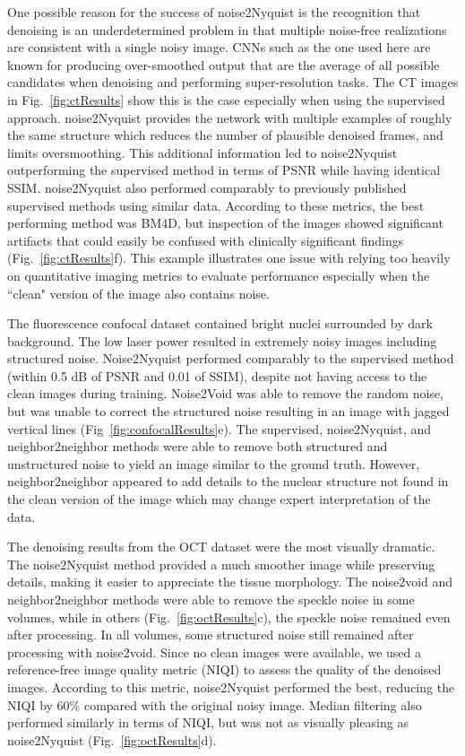 \documentclass[12pt]{spieman}
\begin{document}
\begin{spacing}{2}
One possible reason for the success of noise2Nyquist is the recognition that denoising is an underdetermined problem in that multiple noise-free realizations are consistent with a single noisy image. CNNs such as the one used here are known for producing over-smoothed output that are the average of all possible candidates when denoising\cite{Zhao2019} and performing super-resolution tasks\cite{Lai2017}. The CT images in Fig.~\ref{fig:ctResults} show this is the case especially when using the supervised approach. noise2Nyquist provides the network with multiple examples of roughly the same structure which reduces the number of plausible denoised frames, and limits oversmoothing. This additional information led to noise2Nyquist outperforming the supervised method in terms of PSNR while having identical SSIM. noise2Nyquist also performed comparably to previously published supervised methods using similar data\cite{Gou2019}. According to these metrics, the best performing method was BM4D, but inspection of the images showed significant artifacts that could easily be confused with clinically significant findings (Fig.~\ref{fig:ctResults}f). This example illustrates one issue with relying too heavily on quantitative imaging metrics to evaluate performance especially when the ``clean" version of the image also contains noise.

The fluorescence confocal dataset contained bright nuclei surrounded by dark background. The low laser power resulted in extremely noisy images including structured noise. Noise2Nyquist performed comparably to the supervised method (within 0.5 dB of PSNR and 0.01 of SSIM), despite not having access to the clean images during training. Noise2Void was able to remove the random noise, but was unable to correct the structured noise\cite{Krull2019} resulting in an image with jagged vertical lines (Fig~\ref{fig:confocalResults}e). The supervised, noise2Nyquist, and neighbor2neighbor methods were able to remove both structured and unstructured noise to yield an image similar to the ground truth. However, neighbor2neighbor appeared to add details to the nuclear structure not found in the clean version of the image which may change expert interpretation of the data.

The denoising results from the OCT dataset were the most visually dramatic. The noise2Nyquist method provided a much smoother image while preserving details, making it easier to appreciate the tissue morphology. The noise2void and neighbor2neighbor methods were able to remove the speckle noise in some volumes, while in others (Fig.~\ref{fig:octResults}c), the speckle noise remained even after processing. In all volumes, some structured noise still remained after processing with noise2void. Since no clean images were available, we used a reference-free image quality metric (NIQI) to assess the quality of the denoised images. According to this metric, noise2Nyquist performed the best, reducing the NIQI by 60\% compared with the original noisy image. Median filtering also performed similarly in terms of NIQI, but was not as visually pleasing as noise2Nyquist (Fig.~\ref{fig:octResults}d).


\end{spacing}
\end{document}
